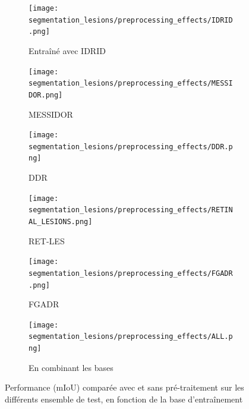 \newcommand{\rowSize}{0.49}
\newcommand{\cellSize}{0.9}

\begin{figure}[H]
	\centering
	\begin{subfigure}{\rowSize\textwidth}
		\texttt{[image: segmentation\_lesions/preprocessing\_effects/IDRID.png]}
		\caption{Entraîné avec IDRID}
	\end{subfigure}
	\begin{subfigure}{\rowSize\textwidth}
		\texttt{[image: segmentation\_lesions/preprocessing\_effects/MESSIDOR.png]}
		\caption{MESSIDOR}
	\end{subfigure}
	\begin{subfigure}{\rowSize\textwidth}
		\texttt{[image: segmentation\_lesions/preprocessing\_effects/DDR.png]}
		\caption{DDR}
	\end{subfigure}
	\begin{subfigure}{\rowSize\textwidth}
		\texttt{[image: segmentation\_lesions/preprocessing\_effects/RETINAL\_LESIONS.png]}
		\caption{RET-LES}
	\end{subfigure}
	\begin{subfigure}{\rowSize\textwidth}
		\texttt{[image: segmentation\_lesions/preprocessing\_effects/FGADR.png]}
		\caption{FGADR}
	\end{subfigure}
	\begin{subfigure}{\rowSize\textwidth}
		\texttt{[image: segmentation\_lesions/preprocessing\_effects/ALL.png]}
		\caption{En combinant les bases}
	\end{subfigure}
	\caption{Performance (mIoU) comparée avec et sans pré-traitement sur les différents ensemble de test, en fonction de la base d'entraînement}
	\label{fig:preprocessingResultsQuantitave}
\end{figure}


